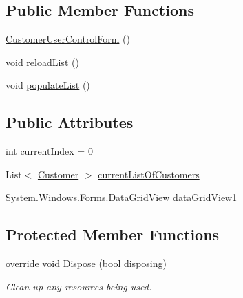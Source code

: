 \subsection*{Public Member Functions}
\begin{DoxyCompactItemize}
\item 
\hyperlink{class_health___assignment_1_1_customer_user_control_form_a7c059181fead34c7420a1ab4c67c1ec5}{Customer\+User\+Control\+Form} ()
\item 
void \hyperlink{class_health___assignment_1_1_customer_user_control_form_acf412584feeb4a0ce10a7bb27a6a7486}{reload\+List} ()
\item 
void \hyperlink{class_health___assignment_1_1_customer_user_control_form_adc676c8705df7fdfac417a1c5ac9de88}{populate\+List} ()
\end{DoxyCompactItemize}
\subsection*{Public Attributes}
\begin{DoxyCompactItemize}
\item 
int \hyperlink{class_health___assignment_1_1_customer_user_control_form_ad64be28fa972b584f41d77292c95fc80}{current\+Index} = 0
\item 
List$<$ \hyperlink{class_health___assignment_1_1_customer}{Customer} $>$ \hyperlink{class_health___assignment_1_1_customer_user_control_form_a99f7baf69fa8a31d475c4b88d77d6517}{current\+List\+Of\+Customers}
\item 
System.\+Windows.\+Forms.\+Data\+Grid\+View \hyperlink{class_health___assignment_1_1_customer_user_control_form_a6e87ff392a92b85ffff6ba01175853c6}{data\+Grid\+View1}
\end{DoxyCompactItemize}
\subsection*{Protected Member Functions}
\begin{DoxyCompactItemize}
\item 
override void \hyperlink{class_health___assignment_1_1_customer_user_control_form_af489ac9c0cc96098384a1a54ebe3faf0}{Dispose} (bool disposing)
\begin{DoxyCompactList}\small\item\em Clean up any resources being used. \end{DoxyCompactList}\end{DoxyCompactItemize}


